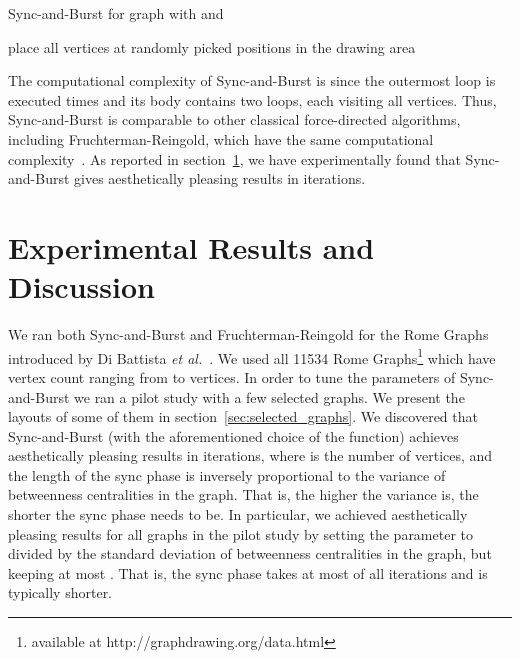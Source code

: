\documentclass{llncs}
\begin{document}
\begin{algorithm}
\caption{Sync-and-Burst for graph  with  and }
\begin{algorithmic}[1]
\STATE place all vertices at randomly picked positions in the drawing area
\STATE 
\STATE 
{}
     \STATE  \label{alg:iteration_start}
          \STATE 
          \STATE 
               \IF{} \label{alg:attraction_start}
                    \STATE 
                    \STATE  
               \ENDIF \label{alg:attraction_end}
               \IF{} \label{alg:repulsion_start}
                    \STATE 
                    \STATE  
               \ENDIF \label{alg:repulsion_end}
           \ENDFOR
           \STATE  \label{alg:coordinates_start}
           \STATE  \label{alg:coordinates_end} \label{alg:iteration_end}
     \ENDFOR
\ENDFOR
\end{algorithmic}
\label{alg:sync-and-burst}
\end{algorithm}

The computational complexity of Sync-and-Burst is  since the outermost loop is executed  times and its body contains two loops, each visiting all vertices. Thus, Sync-and-Burst is comparable to other classical force-directed algorithms, including Fruchterman-Reingold, which have the same computational complexity~\cite{Kobourov2013}. As reported in section~\ref{sec:results}, we have experimentally found that Sync-and-Burst gives aesthetically pleasing results in  iterations.

\section{Experimental Results and Discussion}\label{sec:results}

We ran both Sync-and-Burst and Fruchterman-Reingold for the Rome Graphs introduced by Di Battista \emph{et al.}~\cite{DiBattista1997}. We used all 11534 Rome Graphs\footnote{available at http://graphdrawing.org/data.html} which have vertex count ranging from  to  vertices. In order to tune the parameters of Sync-and-Burst we ran a pilot study with a few selected graphs. We present the layouts of some of them in section~\ref{sec:selected_graphs}. We discovered that Sync-and-Burst (with the aforementioned choice of the  function) achieves aesthetically pleasing results in  iterations, where  is the number of vertices, and the length of the sync phase is inversely proportional to the variance of betweenness centralities in the graph. That is, the higher the variance is, the shorter the sync phase needs to be. In particular, we achieved aesthetically pleasing results for all graphs in the pilot study by setting the parameter  to  divided by the standard deviation of betweenness centralities in the graph, but keeping  at most . That is, the sync phase takes at most  of all  iterations and is typically shorter.
\end{document}
